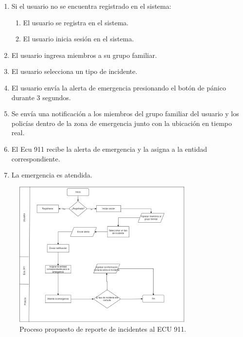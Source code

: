 \begin{enumerate}
    \item Si el usuario no se encuentra registrado en el sistema:
          \begin{enumerate}
              \item El usuario se registra en el sistema.
              \item El usuario inicia sesión en el sistema.
          \end{enumerate}
    \item El usuario ingresa miembros a su grupo familiar.
    \item El usuario selecciona un tipo de incidente.
    \item El usuario envía la alerta de emergencia presionando el botón de pánico durante 3 segundos.
    \item Se envía una notificación a los miembros del grupo familiar del usuario y los policías dentro de la zona de emergencia junto con la ubicación en tiempo real.
    \item El Ecu 911 recibe la alerta de emergencia y la asigna a la entidad correspondiente.
    \item La emergencia es atendida.
\end{enumerate}

\begin{figure}[H]
    \centering
    \includegraphics[width=0.8\textwidth]{chapters/III-resultados-y-discusion/resources/images/proceso-propuesto.png}
    \caption{Proceso propuesto de reporte de incidentes al ECU 911.}
    \label{fig:proceso-propuesto}
\end{figure}

